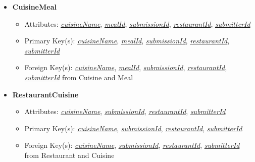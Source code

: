 \documentclass{article}
\begin{document}
\begin{itemize}
        \item \textbf{CuisineMeal}
        \begin{itemize}
            \item Attributes: \underline{\textit{cuisineName}}, \underline{\textit{mealId}}, \underline{\textit{submissionId}}, \underline{\textit{restaurantId}}, \underline{\textit{submitterId}}
            \item Primary Key(s): \underline{\textit{cuisineName}}, \underline{\textit{mealId}}, \underline{\textit{submissionId}}, \underline{\textit{restaurantId}}, \underline{\textit{submitterId}}
            \item Foreign Key(s): \underline{\textit{cuisineName}}, \underline{\textit{mealId}}, \underline{\textit{submissionId}}, \underline{\textit{restaurantId}}, \underline{\textit{submitterId}} from Cuisine and Meal
        \end{itemize}

        \item \textbf{RestaurantCuisine}
        \begin{itemize}
            \item Attributes: \underline{\textit{cuisineName}}, \underline{\textit{submissionId}}, \underline{\textit{restaurantId}}, \underline{\textit{submitterId}}
            \item Primary Key(s): \underline{\textit{cuisineName}}, \underline{\textit{submissionId}}, \underline{\textit{restaurantId}}, \underline{\textit{submitterId}}
            \item Foreign Key(s): \underline{\textit{cuisineName}}, \underline{\textit{submissionId}}, \underline{\textit{restaurantId}}, \underline{\textit{submitterId}} from Restaurant and Cuisine
        \end{itemize}

    \end{itemize}
    
\end{document}
